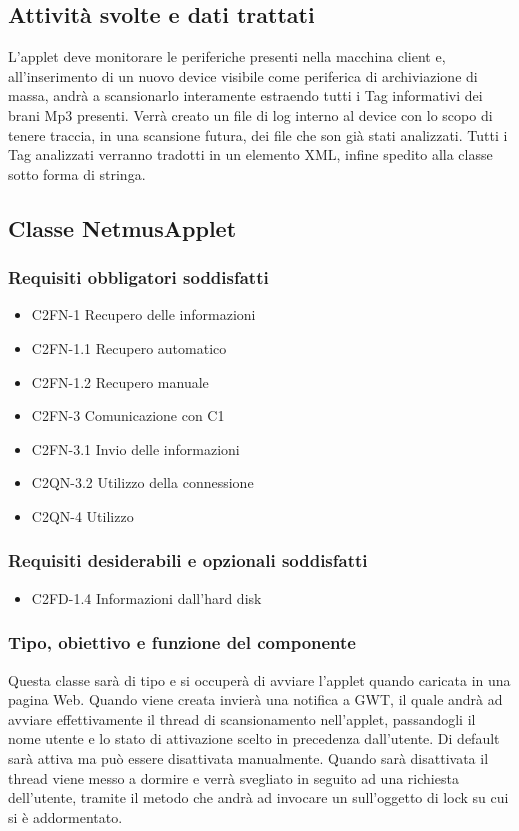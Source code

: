\subsection*{Attivit\`a svolte e dati trattati}
L'applet deve monitorare le periferiche presenti nella macchina client e,
all'inserimento di un nuovo device visibile come periferica di archiviazione di
massa, andr\`a a scansionarlo interamente estraendo tutti i Tag informativi dei
brani Mp3 presenti. Verr\`a creato un file di log interno al device con lo scopo
di tenere traccia, in una scansione futura, dei file che son gi\`a stati
analizzati. Tutti i Tag analizzati verranno tradotti in un elemento XML, infine
spedito alla classe  sotto forma di stringa.\\

\subsection{Classe NetmusApplet}
\subsubsection*{Requisiti obbligatori soddisfatti}
\begin{itemize}
   \item C2FN-1 Recupero delle informazioni
   \item C2FN-1.1 Recupero automatico
   \item C2FN-1.2 Recupero manuale
   \item C2FN-3 Comunicazione con C1
   \item C2FN-3.1 Invio delle informazioni
   \item C2QN-3.2 Utilizzo della connessione
   \item C2QN-4 Utilizzo
\end{itemize}
\subsubsection*{Requisiti desiderabili e opzionali soddisfatti}
\begin{itemize}
   \item C2FD-1.4 Informazioni dall'hard disk
\end{itemize}
\subsubsection*{Tipo, obiettivo e funzione del componente}
Questa classe sar\`a di tipo  e si occuper\`a di avviare l'applet
quando caricata in una pagina Web. Quando viene creata invier\`a una notifica a
GWT, il quale andr\`a ad avviare effettivamente il thread di
scansionamento nell'applet, passandogli il nome utente e lo stato di attivazione scelto in precedenza
dall'utente. Di default sar\`a attiva ma pu\`o essere disattivata manualmente.
Quando sar\`a disattivata il thread  viene messo a dormire e verr\`a
svegliato in seguito ad una richiesta dell'utente, tramite il metodo
 che andr\`a ad invocare un  sull'oggetto di lock su
cui  si \`e addormentato.


